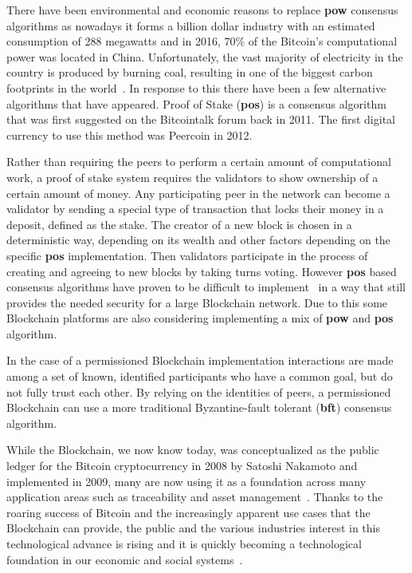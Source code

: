 There have been environmental and economic reasons to replace \textbf{pow}
consensus algorithms as nowadays it forms a billion dollar industry with an
estimated consumption of 288 megawatts and in 2016, 70\% of the Bitcoin's
computational power was located in China. Unfortunately, the vast majority of
electricity in the country is produced by burning coal, resulting in one of the
biggest carbon footprints in the world~\cite{BitcoinMining2017}. In response to
this there have been a few alternative algorithms that have appeared. Proof of
Stake (\textbf{pos}) is a consensus algorithm that was first suggested on the
Bitcointalk forum back in 2011. The first digital currency to use this method
was Peercoin in 2012. 

Rather than requiring the peers to perform a certain amount of computational
work, a proof of stake system requires the validators to show ownership of a
certain amount of money. Any participating peer in the network can become a
validator by sending a special type of transaction that locks their money in a
deposit, defined as the stake. The creator of a new block is chosen in a
deterministic way, depending on its wealth and other factors depending on the
specific \textbf{pos} implementation. Then validators participate in the
process of creating and agreeing to new blocks by taking turns voting. However
\textbf{pos} based consensus algorithms have proven to be difficult to
implement~\cite{EthereumSlasher2014} in a way that still provides the needed
security for a large Blockchain network. Due to this some Blockchain platforms
are also considering implementing a mix of \textbf{pow} and \textbf{pos}
algorithm.

In the case of a permissioned Blockchain implementation interactions are made
among a set of known, identified participants who have a common goal, but do
not fully trust each other. By relying on the identities of peers, a
permissioned Blockchain can use a more traditional Byzantine-fault tolerant
(\textbf{bft}) consensus algorithm.

While the Blockchain, we now know today, was conceptualized as the public
ledger for the Bitcoin cryptocurrency in 2008 by Satoshi Nakamoto and
implemented in 2009, many are now using it as a foundation across many
application areas such as traceability and asset management~\cite{MIT2016}.
Thanks to the roaring success of Bitcoin and the increasingly apparent use
cases that the Blockchain can provide, the public and the various industries
interest in this technological advance is rising and it is quickly becoming a
technological foundation in our economic and social systems~\cite{Zago2018,
Marr2018,Long2018}.

